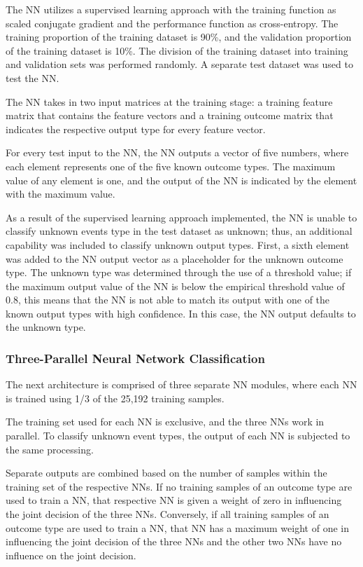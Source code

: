 \documentclass[12pt]{article}
\theoremstyle{definition}
\begin{document}
			The NN utilizes a supervised learning approach with the training function as
			scaled conjugate gradient and the performance function as cross-entropy. The training
			proportion of the training dataset is 90\%, and the validation proportion of the training
			dataset is 10\%. The division of the training dataset into training and validation sets was
			performed randomly. A separate test dataset was used to test the NN.
			
			The NN takes in two input matrices at the training stage: a training feature matrix
			that contains the feature vectors and a training outcome matrix that indicates the
			respective output type for every feature vector.
			
			For every test input to the NN, the NN outputs a vector of five numbers, where
			each element represents one of the five known outcome types. The maximum value of
			any element is one, and the output of the NN is indicated by the element with the
			maximum value.
			
			As a result of the supervised learning approach implemented, the NN is unable to
			classify unknown events type in the test dataset as unknown; thus, an additional
			capability was included to classify unknown output types. First, a sixth element was
			added to the NN output vector as a placeholder for the unknown outcome type. The
			unknown type was determined through the use of a threshold value; if the maximum
			output value of the NN is below the empirical threshold value of 0.8, this means that the NN is not able to match its output with one of the known output types with high
			confidence. In this case, the NN output defaults to the unknown type.
			
			
			\subsubsection{Three-Parallel Neural Network Classification}
			The next architecture is comprised of three separate NN modules, where each NN
			is trained using 1/3 of the 25,192 training samples.
			
			The training set used for each NN is exclusive, and the three NNs work in
			parallel. To classify unknown event types, the output of each NN is subjected to the same
			processing.
			
			Separate outputs are combined based on the number of samples within the
			training set of the respective NNs. If no training samples of an outcome type are used to
			train a NN, that respective NN is given a weight of zero in influencing the joint decision of the three NNs. Conversely, if all training samples of an outcome type are used to train a NN, that NN has a maximum weight of one in influencing the joint decision of the three NNs and the other two NNs have no influence on the joint decision.
			
\end{document}

